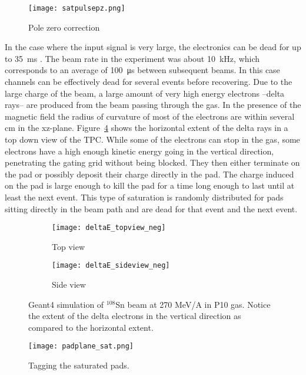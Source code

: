 \begin{figure}[!htb]
\centering
\texttt{[image: satpulsepz.png]} 
\caption{Pole zero correction} 
\label{fig:pulseSatTag}
\end{figure}


In the case where the input signal is very large, the electronics can be dead for up to \SI{35}{\milli\second} \cite{akiGET}. The beam rate in the experiment was about \SI{10}{\kilo\hertz}, which corresponds to an average of \SI{100}{\micro\second} between subsequent beams. In this case channels can be effectively dead for several events before recovering. Due to the large charge of the beam, a large amount of very high energy electrons --delta rays-- are produced from the beam passing through the gas. In the presence of the magnetic field the radius of curvature of most of the electrons are within several \si{cm} in the xz-plane. Figure~\ref{fig:deltaE} shows the horizontal extent of the delta rays in a top down view of the TPC. While some of the electrons can stop in the gas, some electrons have a high enough kinetic energy going in the vertical direction, penetrating the gating grid without being blocked. They then either terminate on the pad or possibly deposit their charge directly in the pad. The charge induced on the pad is large enough to kill the pad for a time long enough to last until at least the next event. This type of saturation is randomly distributed for pads sitting directly in the beam path and are dead for that event and the next event. 


\begin{figure}[!htb]
    \centering
    \begin{subfigure}[t]{0.49\textwidth}
        \centering
        \texttt{[image: deltaE\_topview\_neg]} 
        \caption{Top view} \label{fig:deltaE_topview}
    \end{subfigure}
    \hfill
    \begin{subfigure}[t]{0.49\textwidth}
        \centering
        \texttt{[image: deltaE\_sideview\_neg]} 
        \caption{Side view} \label{fig:deltaE_sideview}
    \end{subfigure}
    \caption{Geant4 simulation of ${}^{108}$Sn beam at 270 MeV/A in P10 gas. Notice the extent of the delta electrons in the vertical direction as compared to the horizontal extent. }
\label{fig:deltaE}
\end{figure}


\begin{figure}[!htb]
\texttt{[image: padplane\_sat.png]}
\caption{Tagging the saturated pads.}
\label{fig:satTag}
\end{figure}

